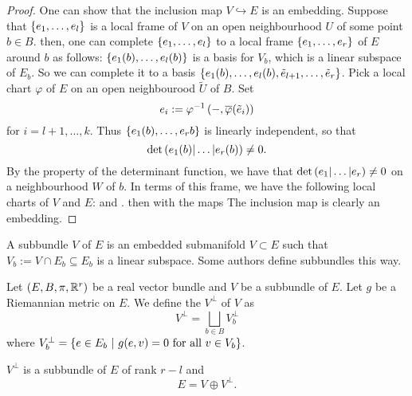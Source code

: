 \documentclass[main.tex]{subfiles}
\begin{document}
\begin{proof}
  One can show that the inclusion map $V \hookrightarrow E$ is an embedding.
  Suppose that $\left\{e_1, \dots, e_l\right\}$ is a local frame of $V$ on an open neighbourhood $U$ of some point $b \in B$. then, one can complete $\left\{e_1, \dots, e_l\right\}$ to a local frame $\left\{e_1,\dots, e_r\right\}$ of $E$ around $b$ as follows: $\left\{e_1(b), \dots, e_l(b)\right\}$ is a basis for $V_b$, which is a linear subspace of $E_b$. So we can complete it to a basis $\left\{e_1(b), \dots, e_l(b), \tilde{e}_{l+1}, \dots, \tilde{e}_r \right\}$.
  Pick a local chart $\varphi$ of $E$ on an open neighbourood $\tilde{U}$ of $B$. Set
  \[
  e_i := \varphi^{-1} \left( -, \overline{\varphi}(\tilde{e}_i) \right)
  \] for $i = l+1, \dots, k$. Thus $\left\{e_1(b), \dots, e_r{b}\right\}$ is linearly independent, so that
  \[
  \det\left(  e_1(b) | \dots | e_r(b)   \right) \neq 0.
  \]
  By the property of the determinant function, we have that $\det\left( e_1|\dots |e_r \right)\neq 0 $ on a neighbourhood $W$ of $b$. In terms of this frame, we have the following local charts of $V$ and $E$:
   and
  .
   then
    with the maps
   The inclusion map is clearly an embedding.
\end{proof}

\begin{rmk}
  A subbundle $V$ of $E$ is an embedded submanifold $V \subset E$ such that $V_b := V \cap E_b \subseteq E_b$ is a linear subspace. Some authors define subbundles this way.
\end{rmk}


\begin{defn}
 Let $(E, B, \pi, \mathbb{R}^r)$ be a real vector bundle and $V$ be a subbundle of $E$. Let $g$ be a Riemannian metric on $E$. We define the  $V^\perp$ of $V$ as
 \[
 V^\perp = \bigsqcup_{b \in B} V_b^\perp
 \]
 where $V_b^\perp = \left\{ e \in E_b \ | \  g(e, v) = 0 \text{ for all $v \in V_b$}\right\}$.
\end{defn}

\begin{prop}
  $V^\perp$ is a subbundle of $E$ of rank $r - l$ and
  \[
  E = V \oplus V^\perp.
  \]
\end{prop}
\end{document}
